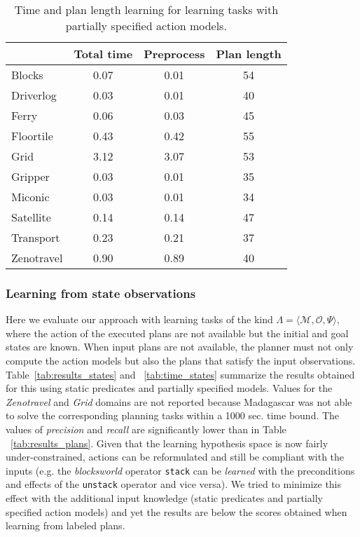 \documentclass[3p,times]{elsarticle}
\newcommand{\tup}[1]{{\langle #1 \rangle}}
\begin{document}
\begin{table}
\begin{footnotesize}
	\begin{center}
		\begin{tabular}{l|c|c|c|}			
			 & Total time & Preprocess & Plan length  \\
                         \hline
			Blocks & 0.07 & 0.01 & 54  \\
			Driverlog & 0.03 & 0.01 & 40 \\
			Ferry & 0.06 & 0.03 & 45 \\
			Floortile & 0.43 & 0.42 & 55 \\
                        Grid & 3.12 & 3.07 & 53 \\
			Gripper & 0.03 & 0.01 & 35 \\
			Miconic & 0.03 & 0.01 & 34  \\
			Satellite & 0.14 & 0.14 & 47 \\
			Transport & 0.23 & 0.21 & 37 \\
			Zenotravel & 0.90 & 0.89 & 40 \\
		\end{tabular}
	\end{center}
        \end{footnotesize}
	\caption{\small Time and plan length learning for learning tasks with partially specified action models.}
	\label{tab:time_plans_partial}	
\end{table}


\subsubsection{Learning from state observations}
Here we evaluate our approach with learning tasks of the kind $\Lambda=\tup{\mathcal{M},\mathcal{O},\Psi}$, where the action of the executed plans are not available but the initial and goal states are known. When input plans are not available, the planner must not only compute the action models but also the plans that satisfy the input observations. Table~\ref{tab:results_states} and ~\ref{tab:time_states} summarize the results obtained for this using static predicates and partially specified models. Values for the {\em Zenotravel} and {\em Grid} domains are not reported because {\sc Madagascar} was not able to solve the corresponding planning tasks within a 1000 sec. time bound. The values of \emph{precision} and \emph{recall} are significantly lower than in Table ~\ref{tab:results_plans}. Given that the learning hypothesis space is now fairly under-constrained, actions can be reformulated and still be compliant with the inputs (e.g. the {\em blocksworld} operator {\small\tt stack} can be {\em learned} with the preconditions and effects of the {\small\tt unstack} operator and vice versa). We tried to minimize this effect with the additional input knowledge (static predicates and partially specified action models) and yet the results are below the scores obtained when learning from labeled plans.
\end{document}
